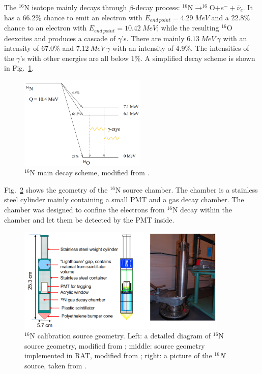 The $^{16}$N isotope mainly decays through $\beta$-decay process: $^{16}$N$\to ^{16}$O$+e^-+\bar{\nu}_e$. It has a 66.2\% chance to emit an electron with $E_{end~point}=4.29~MeV$ and a 22.8\% chance to an electron with $E_{end~point}=10.42~MeV$; while the resulting $^{16}$O deexcites and produces a cascade of $\gamma$'s. There are mainly $6.13~MeV~\gamma$ with an intensity of 67.0\% and 
$7.12~MeV~\gamma$ with an intensity of 4.9\%. The intensities of the $\gamma$'s with other energies are all below 1\%\cite{nndc}. A simplified decay scheme is shown in Fig.~\ref{n16decay}.

\begin{figure}[!htb]
	\centering
	\includegraphics[width=6cm]{n16_decay.png}
	\caption{$^{16}$N main decay scheme, modified from \cite{dragowsky200216n}.}
	\label{n16decay}
\end{figure}

Fig.~\ref{n16pic} shows the geometry of the $^{16}$N source chamber. The chamber is a stainless steel cylinder mainly containing a small PMT and a gas decay chamber. The chamber was designed to confine the electrons from $^{16}$N decay within the chamber and let them be detected by the PMT inside\cite{dragowsky1999sudbury}.






\begin{figure}[!htb]
	\centering
	\includegraphics[width=10cm]{n16geom.png}
	\caption{$^{16}$N calibration source geometry. Left: a detailed diagram of $^{16}$N source geometry, modified from \cite{maclellan2009energy,matt_deployedsource}; middle: source geometry implemented in RAT, modified from \cite{n16geom_zach}; right: a picture of the $^{16}N$ source, taken from \cite{n16pic}.}
	\label{n16pic}
\end{figure}

